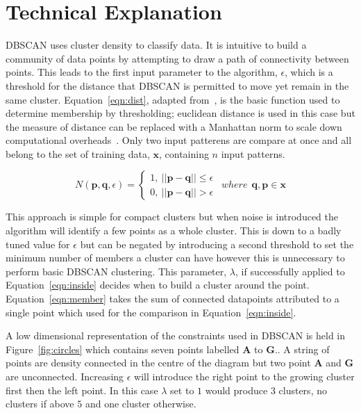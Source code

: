 \documentclass{ecsarticle}     %
\begin{document}
\section{Technical Explanation}

DBSCAN uses cluster density to classify data.
It is intuitive to build a community of data points by attempting to draw a path of connectivity between points.
This leads to the first input parameter to the algorithm, $\epsilon$, which is a threshold for the distance that DBSCAN is permitted to move yet remain in the same cluster.
Equation~\eqref{eqn:dist}, adapted from~\cite{ester96dbscan}, is the basic function used to determine membership by thresholding; euclidean distance is used in this case but the measure of distance can be replaced with a Manhattan norm to scale down computational overheads~\citep{krause86taxicab}.
Only two input patterens are compare at once and all belong to the set of training data, $\textbf{x}$, containing $n$ input patterns.

\begin{equation}
	N(\textbf{p},\textbf{q},\epsilon) = \left\{
		\begin{array}{l}
    		1,\: ||\textbf{p} - \textbf{q}|| \leq \epsilon\\
    		0,\: ||\textbf{p} - \textbf{q}|| > \epsilon
  		\end{array} \right.
	\:\:where\:\: \textbf{q},\textbf{p} \in \textbf{x}
	\label{eqn:dist}
\end{equation}


This approach is simple for compact clusters but when noise is introduced the algorithm will identify a few points as a whole cluster.
This is down to a badly tuned value for $\epsilon$ but can be negated by introducing a second threshold to set the minimum number of members a cluster can have however this is unnecessary to perform basic DBSCAN clustering.
This parameter, $\lambda$, if successfully applied to Equation~\eqref{eqn:inside} decides when to build a cluster around the point.
Equation~\eqref{eqn:member} takes the sum of connected datapoints attributed to a single point which used for the comparison in Equation~\eqref{eqn:inside}. 

A low dimensional representation of the constraints used in DBSCAN is held in Figure~\ref{fig:circles} which contains seven points labelled \textbf{A} to \textbf{G}..
A string of points are density connected in the centre of the diagram but two point \textbf{A} and \textbf{G} are unconnected.
Increasing $\epsilon$ will introduce the right point to the growing cluster first then the left point.
In this case $\lambda$ set to $1$ would produce $3$ clusters, no clusters if above $5$ and one cluster otherwise.
\end{document}
